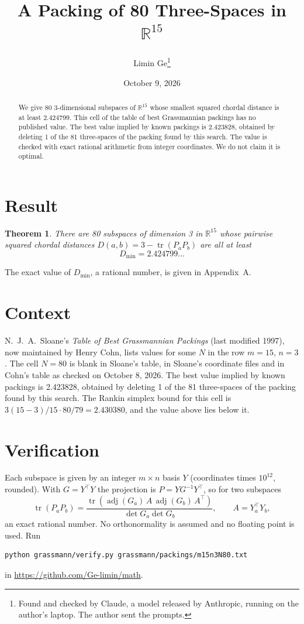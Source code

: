 \documentclass[11pt,a4paper]{article}
\title{A Packing of 80 Three-Spaces in $\mathbb{R}^{15}$}
\author{Limin Ge\thanks{Found and checked by Claude, a model released by Anthropic, running on the author's laptop. The author sent the prompts.}}
\date{October 9, 2026}
\newtheorem*{theorem}{Theorem}
\begin{document}
\maketitle
\begin{abstract}
We give 80 3-dimensional subspaces of $\mathbb{R}^{15}$ whose smallest squared chordal distance is at least 2.424799. This cell of the table of best Grassmannian packings has no published value. The best value implied by known packings is 2.423828, obtained by deleting 1 of the 81 three-spaces of the packing found by this search. The value is checked with exact rational arithmetic from integer coordinates. We do not claim it is optimal.
\end{abstract}

\section{Result}
\begin{theorem}
There are 80 subspaces of dimension 3 in $\mathbb{R}^{15}$ whose pairwise squared chordal distances $D(a,b) = 3 - \operatorname{tr}(P_aP_b)$ are all at least
\[ D_{\min} = 2.424799\ldots \]
\end{theorem}
The exact value of $D_{\min}$, a rational number, is given in Appendix~A.


\section{Context}
N.~J.~A.~Sloane's \emph{Table of Best Grassmannian Packings} (last modified 1997), now maintained by Henry Cohn, lists values for some $N$ in the row $m=15$, $n=3$. The cell $N=80$ is blank in Sloane's table, in Sloane's coordinate files and in Cohn's table as checked on October 8, 2026. The best value implied by known packings is 2.423828, obtained by deleting 1 of the 81 three-spaces of the packing found by this search. The Rankin simplex bound for this cell is $3(15-3)/15\cdot 80/79 = 2.430380$, and the value above lies below it.


\section{Verification}
Each subspace is given by an integer $m\times n$ basis $Y$ (coordinates times $10^{12}$, rounded). With $G=Y^\top Y$ the projection is $P=YG^{-1}Y^\top$, so for two subspaces
\[ \operatorname{tr}(P_aP_b)=\frac{\operatorname{tr}(\operatorname{adj}(G_a)\,A\,\operatorname{adj}(G_b)\,A^\top)}{\det G_a\det G_b},\qquad A=Y_a^\top Y_b, \]
an exact rational number. No orthonormality is assumed and no floating point is used. Run
\begin{verbatim}
python grassmann/verify.py grassmann/packings/m15n3N80.txt
\end{verbatim}
in \url{https://github.com/Ge-limin/math}.
\end{document}
